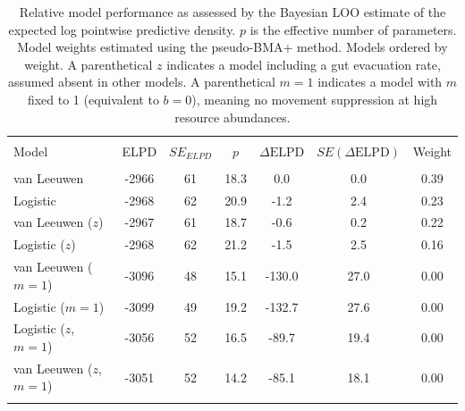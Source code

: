 \begin{table}[!htbp] \centering
  \caption{Relative model performance as assessed by the Bayesian LOO
    estimate of the expected log pointwise predictive density.
    $p$ is the effective number of parameters.
    Model weights estimated using the pseudo-BMA+ method.
    Models ordered by weight.
    A parenthetical $z$ indicates a model including a gut
    evacuation rate, assumed absent in other models.
    A parenthetical $m=1$ indicates a model with $m$ fixed to 1
    (equivalent to $b=0$), meaning no movement suppression at high resource
    abundances.}
  \label{tab:modelcomp_LOO}
\begin{tabular}{@{\extracolsep{5pt}} lcccccc}
\\[-1.8ex]\hline
\hline \\[-1.8ex]
Model & ELPD & $SE_{ELPD}$ & $p$ & $\Delta \text{ELPD}$ & $SE(\Delta \text{ELPD})$ & Weight \\
\hline \\[-1.8ex]
van Leeuwen & -2966 & 61 & 18.3 & 0.0 & 0.0 & 0.39 \\
Logistic & -2968 & 62 & 20.9 & -1.2 & 2.4 & 0.23 \\
van Leeuwen ($z$) & -2967 & 61 & 18.7 & -0.6 & 0.2 & 0.22 \\
Logistic ($z$) & -2968 & 62 & 21.2 & -1.5 & 2.5 & 0.16 \\
van Leeuwen ($m=1$) & -3096 & 48 & 15.1 & -130.0 & 27.0 & 0.00 \\
Logistic ($m=1$) & -3099 & 49 & 19.2 & -132.7 & 27.6 & 0.00 \\
Logistic ($z$, $m=1$) & -3056 & 52 & 16.5 & -89.7 & 19.4 & 0.00 \\
van Leeuwen ($z$, $m=1$) & -3051 & 52 & 14.2 & -85.1 & 18.1 & 0.00 \\
\hline \\[-1.8ex]
\end{tabular}
\end{table}

